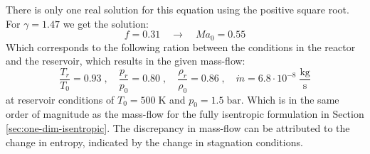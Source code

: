 	There is only one real solution for this equation using the positive square root.
	For $\gamma = 1.47$ we get the solution:
	$$
		f = 0.31
			\quad \to \quad
		Ma_0 = 0.55
	$$
	Which corresponds to the following ration between the conditions in the reactor and the reservoir, which results in the given mass-flow:
	$$
		\frac{T_r}{T_0} = 0.93\;, \quad \frac{p_r}{p_0} = 0.80\;, \quad \frac{\rho_r}{\rho_0} = 0.86\;, \quad
		\dot{m} = 6.8 \cdot 10^{-8} \; \frac{\text{kg}}{\text{s}}
	$$
	at reservoir conditions of $T_0 = 500\;\text{K}$ and $p_0 = 1.5\;\text{bar}$.
	Which is in the same order of magnitude as the mass-flow for the fully isentropic formulation in Section \ref{sec:one-dim-isentropic}.
	The discrepancy in mass-flow can be attributed to the change in entropy, indicated by the change in stagnation conditions.
	\newpage

